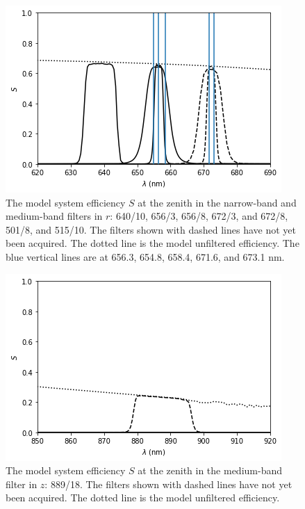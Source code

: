 \begin{figure}
\begin{center}
\includegraphics[width=0.9\linewidth]{figures/huitzi-S-NBMB-r.png}
\medskip
\caption{The model system efficiency $S$ at the zenith in the narrow-band and medium-band filters in $r$: 640/10, 656/3, 656/8, 672/3, and 672/8, 501/8, and 515/10. The filters shown with dashed lines have not yet been acquired. The dotted line is the model unfiltered efficiency. The blue vertical lines are at 656.3, 654.8, 658.4, 671.6, and 673.1 nm.}
\end{center}
\end{figure}

\begin{figure}
\begin{center}
\includegraphics[width=0.9\linewidth]{figures/huitzi-S-NBMB-z.png}
\medskip
\caption{The model system efficiency $S$ at the zenith in the medium-band filter in $z$: 889/18. The filters shown with dashed lines have not yet been acquired. The dotted line is the model unfiltered efficiency.}
\label{figure:huitzi-S-last}
\end{center}
\end{figure}

